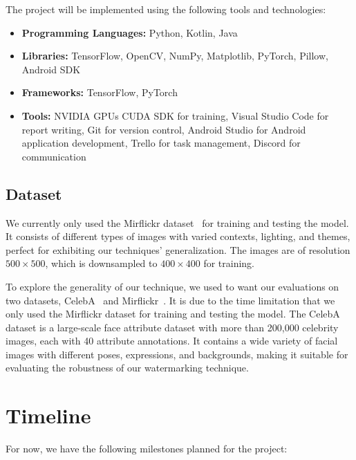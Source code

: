 \documentclass[acmsmall, nonacm]{acmart}
\begin{document}
The project will be implemented using the following tools and technologies:

\begin{itemize}
  \item \textbf{Programming Languages:} Python, Kotlin, Java
  \item \textbf{Libraries:} TensorFlow, OpenCV, NumPy, Matplotlib, PyTorch, Pillow, Android SDK
  \item \textbf{Frameworks:} TensorFlow, PyTorch
  \item \textbf{Tools:} NVIDIA GPUs CUDA SDK for training, Visual Studio Code for report writing, Git for version control, Android Studio for Android application development, Trello for task management, Discord for communication
\end{itemize}

\subsection{Dataset}\label{subsec:dataset}

We currently only used the Mirflickr dataset~\cite{mir} for training and testing the model. It consists of different types of images with varied contexts, lighting, and themes, perfect for exhibiting our techniques' generalization. The images are of resolution $500\times500$, which is downsampled to $400\times400$ for training.

To explore the generality of our technique, we used to want our evaluations on two datasets, CelebA~\cite{celeba} and Mirflickr~\cite{mir}. It is due to the time limitation that we only used the Mirflickr dataset for training and testing the model. The CelebA dataset is a large-scale face attribute dataset with more than 200,000 celebrity images, each with 40 attribute annotations. It contains a wide variety of facial images with different poses, expressions, and backgrounds, making it suitable for evaluating the robustness of our watermarking technique.

\section{Timeline}\label{sec:timeline}


For now, we have the following milestones planned for the project:
\end{document}
